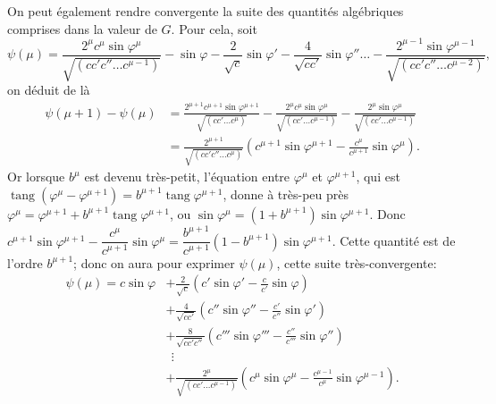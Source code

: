 \documentclass{article}
\begin{document}
On peut également rendre convergente la suite des quantités algébriques comprises dans la valeur de $G$. Pour cela, soit
\[ \psi(\mu)=\frac{2^{\mu}c^{\mu}\sin\varphi^{\mu}}{\sqrt{(cc'c''\ldots c^{\mu-1})}}-\sin\varphi-\frac{2}{\sqrt{c}}\sin\varphi'-\frac{4}{\sqrt{cc'}}\sin\varphi''\ldots-\frac{2^{\mu-1}\sin\varphi^{\mu-1}}{\sqrt{(cc'c''\ldots c^{\mu-2})}}, \]
on déduit de là
\[ \begin{aligned} \psi(\mu+1)-\psi(\mu)&=\frac{2^{\mu+1}c^{\mu+1}\sin\varphi^{\mu+1}}{\sqrt{(cc'\ldots c^{\mu})}}-\frac{2^{\mu}c^{\mu}\sin\varphi^{\mu}}{\sqrt{(cc'\ldots c^{\mu-1})}}-\frac{2^{\mu}\sin\varphi^{\mu}}{\sqrt{(cc'\ldots c^{\mu-1})}}\\ &=\frac{2^{\mu+1}}{\sqrt{(cc'c''\ldots c^{\mu})}}\left(c^{\mu+1}\sin\varphi^{\mu+1}-\frac{c^{\mu}}{c^{\mu+1}}\sin\varphi^{\mu}\right). \end{aligned} \]
Or lorsque $b^{\mu}$ est devenu très-petit, l'équation entre $\varphi^{\mu}$ et $\varphi^{\mu+1}$, qui est $\operatorname{tang}(\varphi^{\mu}-\varphi^{\mu+1})=b^{\mu+1}\operatorname{tang}\varphi^{\mu+1}$, donne à très-peu près $\varphi^{\mu}=\varphi^{\mu+1}+b^{\mu+1}\operatorname{tang}\varphi^{\mu+1}$, ou $\sin\varphi^{\mu}=(1+b^{\mu+1})\sin\varphi^{\mu+1}$. Donc $c^{\mu+1}\sin\varphi^{\mu+1}-\dfrac{c^{\mu}}{c^{\mu+1}}\sin\varphi^{\mu}=\dfrac{b^{\mu+1}}{c^{\mu+1}}(1-b^{\mu+1})\sin\varphi^{\mu+1}$. Cette quantité est de l'ordre $b^{\mu+1}$; donc on aura pour exprimer $\psi(\mu)$, cette suite très-convergente:
\[ \begin{aligned} \psi(\mu)=c\sin\varphi&+\frac{2}{\sqrt{c}}\left(c'\sin\varphi'-\frac{c}{c'}\sin\varphi\right)\\ &+\frac{4}{\sqrt{cc'}}\left(c''\sin\varphi''-\frac{c'}{c''}\sin\varphi'\right)\\ &+\frac{8}{\sqrt{cc'c''}}\left(c'''\sin\varphi'''-\frac{c''}{c'''}\sin\varphi''\right)\\ &\ \ \vdots\\ &+\frac{2^{\mu}}{\sqrt{(cc'\ldots c^{\mu-1})}}\left(c^{\mu}\sin\varphi^{\mu}-\frac{c^{\mu-1}}{c^{\mu}}\sin\varphi^{\mu-1}\right). \end{aligned} \]
\end{document}
